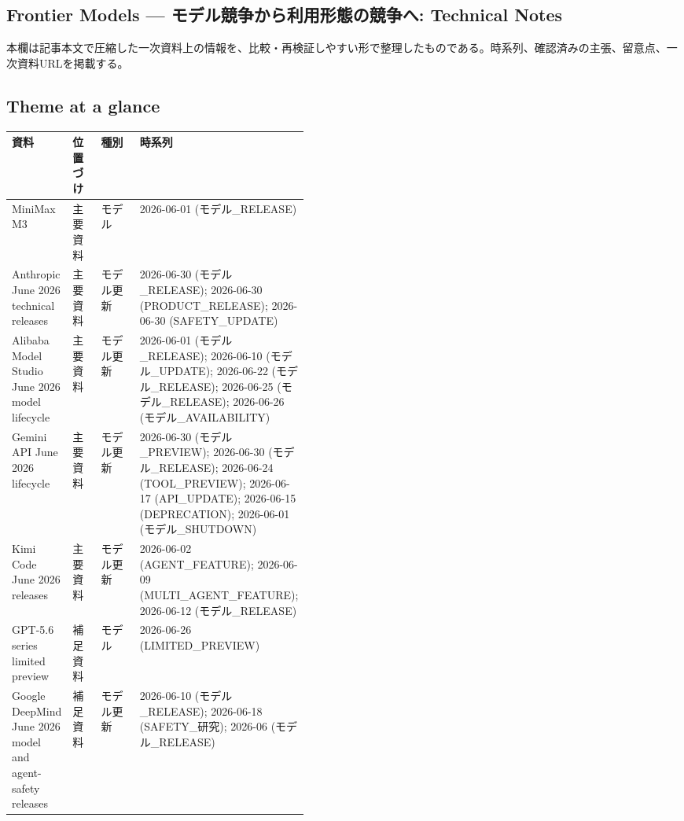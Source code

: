 \subsection*{Frontier Models — モデル競争から利用形態の競争へ: Technical Notes}
本欄は記事本文で圧縮した一次資料上の情報を、比較・再検証しやすい形で整理したものである。時系列、確認済みの主張、留意点、一次資料URLを掲載する。
\medskip
\subsection*{Theme at a glance}
\begin{center}
\footnotesize
\begin{tabularx}{\linewidth}{@{}p{0.20\linewidth}p{0.10\linewidth}p{0.14\linewidth}X@{}}
\toprule
資料 & 位置づけ & 種別 & 時系列 \\
\midrule
MiniMax M3 & 主要資料 & モデル & 2026-06-01 (モデル\_RELEASE) \\
Anthropic June 2026 technical releases & 主要資料 & モデル更新 & 2026-06-30 (モデル\_RELEASE); 2026-06-30 (PRODUCT\_RELEASE); 2026-06-30 (SAFETY\_UPDATE) \\
Alibaba Model Studio June 2026 model lifecycle & 主要資料 & モデル更新 & 2026-06-01 (モデル\_RELEASE); 2026-06-10 (モデル\_UPDATE); 2026-06-22 (モデル\_RELEASE); 2026-06-25 (モデル\_RELEASE); 2026-06-26 (モデル\_AVAILABILITY) \\
Gemini API June 2026 lifecycle & 主要資料 & モデル更新 & 2026-06-30 (モデル\_PREVIEW); 2026-06-30 (モデル\_RELEASE); 2026-06-24 (TOOL\_PREVIEW); 2026-06-17 (API\_UPDATE); 2026-06-15 (DEPRECATION); 2026-06-01 (モデル\_SHUTDOWN) \\
Kimi Code June 2026 releases & 主要資料 & モデル更新 & 2026-06-02 (AGENT\_FEATURE); 2026-06-09 (MULTI\_AGENT\_FEATURE); 2026-06-12 (モデル\_RELEASE) \\
GPT-5.6 series limited preview & 補足資料 & モデル & 2026-06-26 (LIMITED\_PREVIEW) \\
Google DeepMind June 2026 model and agent-safety releases & 補足資料 & モデル更新 & 2026-06-10 (モデル\_RELEASE); 2026-06-18 (SAFETY\_研究); 2026-06 (モデル\_RELEASE) \\
\bottomrule
\end{tabularx}
\end{center}
\normalsize

